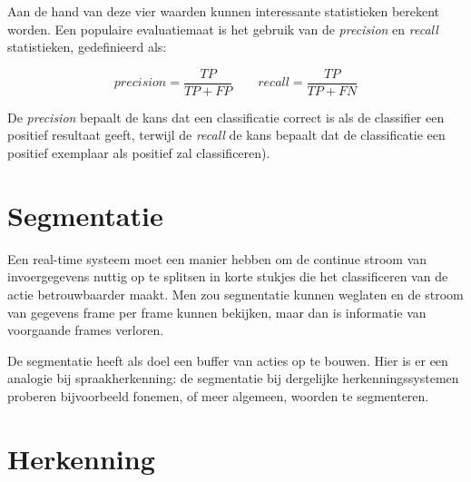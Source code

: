 Aan de hand van deze vier waarden kunnen interessante statistieken berekent worden. Een populaire evaluatiemaat is het gebruik van de \textit{precision} en \textit{recall} statistieken, gedefinieerd als:

$$precision = \frac{TP}{TP + FP} \qquad recall = \frac{TP}{TP + FN}$$

De \textit{precision} bepaalt de kans dat een classificatie correct is als de classifier een positief resultaat geeft, terwijl de \textit{recall} de kans bepaalt dat de classificatie een positief exemplaar als positief zal classificeren).



\section{Segmentatie}
Een real-time systeem moet een manier hebben om de continue stroom van invoergegevens nuttig op te splitsen in korte stukjes die het classificeren van de actie betrouwbaarder maakt. Men zou segmentatie kunnen weglaten en de stroom van gegevens frame per frame kunnen bekijken, maar dan is informatie van voorgaande frames verloren.

De segmentatie heeft als doel een buffer van acties op te bouwen. Hier is er een analogie bij spraakherkenning: de segmentatie bij dergelijke herkenningssystemen proberen bijvoorbeeld fonemen, of meer algemeen, woorden te segmenteren.




\section{Herkenning}